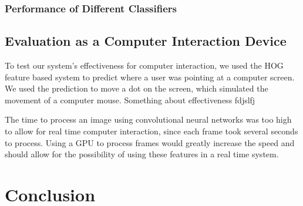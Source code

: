 \documentclass[10pt,twocolumn,letterpaper]{article}
\begin{document}
\subsubsection{Performance of Different Classifiers}

\subsection{Evaluation as a Computer Interaction Device}

To test our system's effectiveness for computer interaction, we used the HOG feature based system to predict where a user was pointing at a computer screen.  We used the prediction to move a dot on the screen, which simulated the movement of a computer mouse.  Something about effectiveness fdjslfj

The time to process an image using convolutional neural networks was too high to allow for real time computer interaction, since each frame took several seconds to process.  Using a GPU to process frames would greatly increase the speed and should allow for the possibility of using these features in a real time system.

\section{Conclusion}


{\small


}
\end{document}

